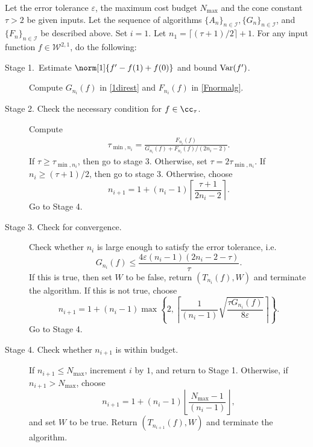\begin{algo} \label{multistageintegalgo}
Let the error tolerance $\varepsilon$, the maximum cost budget $N_{\text{max}}$ and the cone constant $\tau>2$ be given inputs. Let the sequence of algorithms $\{A_n\}_{n\in \mathcal{I}}, \{G_n\}_{n\in \mathcal{I}}$, and $\{F_n\}_{n\in \mathcal{I}}$ be described above. Set $i=1$. Let $n_1=\lceil(\tau+1)/2\rceil+1$. For any input function $f\in \mathcal{W}^{2,1}$, do the following:
\begin{description}
\item[Stage 1.\ Estimate {$\norm[1]{f'-f(1)+f(0)}$} and bound {$\operatorname{Var}(f')$}.] Compute $G_{n_i}(f)$ in \eqref{1direst} and $F_{n_i}(f)$ in \eqref{Fnormalg}.

\item[Stage 2. Check the necessary condition for $f \in \cc_{\tau}$.] Compute 
    \begin{align*}
     \tau_{\min,n_i} =  \frac{F_{n_i}(f)}{G_{n_i}(f)+F_{n_i}(f)/(2n_i-2)}.
    \end{align*}
If $\tau \ge \tau_{\min,n_i}$, then go to stage 3.  Otherwise, set $\tau = 2\tau_{\min,n_i}$.  If $n_i \ge (\tau+1)/2$, then go to stage 3.  Otherwise, choose 
$$
n_{i+1}=1+ (n_i-1)\left\lceil\frac{\tau+1}{2n_i-2}\right\rceil.
$$
Go to Stage 4.

\item[Stage 3. Check for convergence.] Check whether $n_i$ is large enough to satisfy the error tolerance, i.e.
    \begin{equation*}
     G_{n_i}(f) \le \frac{4\varepsilon(n_i-1)(2n_i-2 - \tau)}{\tau}.
    \end{equation*}
If this is true, then set $W$ to be false, return $(T_{n_i}(f),W)$ and terminate the algorithm.   If this is not true, choose
$$
n_{i+1}=1+ (n_i-1)\max\left\{2,\left\lceil\frac{1}{(n_i-1)}\sqrt{\frac{\tau G_{n_i}(f)}{8\varepsilon}}\right\rceil\right\}.
$$
Go to Stage 4.

\item[Stage 4. Check whether $n_{i+1}$ is within budget.] If $n_{i+1} \le N_{\max}$, increment $i$ by $1$, and return to Stage 1.  Otherwise, if $n_{i+1} > N_{\max}$, choose 
$$
n_{i+1}=1+ (n_i-1)\left\lfloor\frac{N_{\max}-1}{(n_i-1)}\right\rfloor,
$$
and set $W$ to be true. Return $(T_{n_{i+1}}(f),W)$ and terminate the algorithm.
\end{description}
\end{algo}

